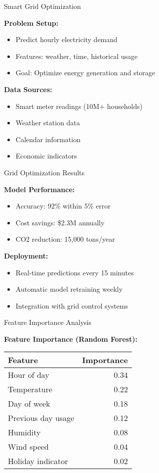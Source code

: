 \documentclass{sustainabilitylab}
\begin{document}
\begin{frame}{Smart Grid Optimization}

\textbf{Problem Setup:}
\begin{itemize}
  \item Predict hourly electricity demand
  \item Features: weather, time, historical usage
  \item Goal: Optimize energy generation and storage
\end{itemize}

\textbf{Data Sources:}
\begin{itemize}
  \item Smart meter readings (10M+ households)
  \item Weather station data
  \item Calendar information
  \item Economic indicators
\end{itemize}

\end{frame}

\begin{frame}{Grid Optimization Results}

\textbf{Model Performance:}
\begin{itemize}
  \item Accuracy: 92\% within 5\% error
  \item Cost savings: \$2.3M annually
  \item CO2 reduction: 15,000 tons/year
\end{itemize}

\textbf{Deployment:}
\begin{itemize}
  \item Real-time predictions every 15 minutes
  \item Automatic model retraining weekly
  \item Integration with grid control systems
\end{itemize}

\end{frame}

\begin{frame}{Feature Importance Analysis}

\textbf{Feature Importance (Random Forest):}

\begin{tabular}{lr}
\toprule
\textbf{Feature} & \textbf{Importance} \\
\midrule
Hour of day & 0.34 \\
Temperature & 0.22 \\
Day of week & 0.18 \\
Previous day usage & 0.12 \\
Humidity & 0.08 \\
Wind speed & 0.04 \\
Holiday indicator & 0.02 \\
\bottomrule
\end{tabular}

\end{frame}
\end{document}
